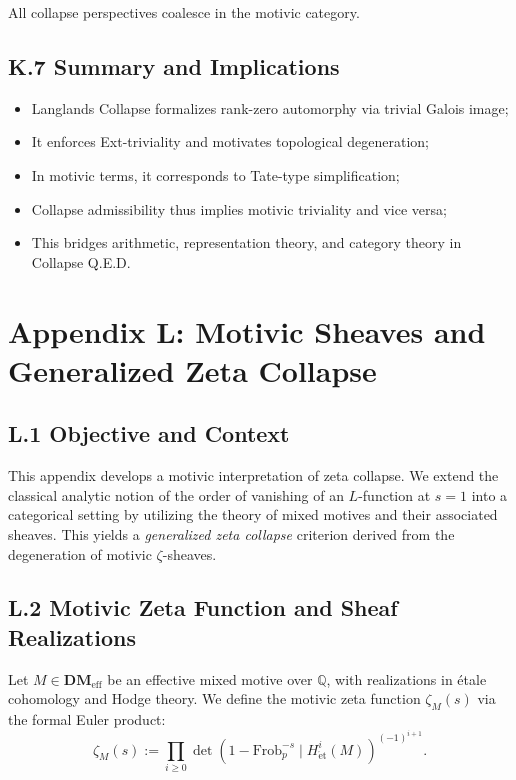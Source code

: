 \documentclass[11pt]{article}
\begin{document}
All collapse perspectives coalesce in the motivic category.

\subsection*{K.7 Summary and Implications}

\begin{itemize}
  \item Langlands Collapse formalizes rank-zero automorphy via trivial Galois image;
  \item It enforces Ext-triviality and motivates topological degeneration;
  \item In motivic terms, it corresponds to Tate-type simplification;
  \item Collapse admissibility thus implies motivic triviality and vice versa;
  \item This bridges arithmetic, representation theory, and category theory in Collapse Q.E.D.
\end{itemize}



\appendix
\section*{Appendix L: Motivic Sheaves and Generalized Zeta Collapse}

\subsection*{L.1 Objective and Context}

This appendix develops a motivic interpretation of zeta collapse. We extend the classical analytic notion of the order of vanishing of an \( L \)-function at \( s=1 \) into a categorical setting by utilizing the theory of mixed motives and their associated sheaves. This yields a \emph{generalized zeta collapse} criterion derived from the degeneration of motivic \( \zeta \)-sheaves.

\subsection*{L.2 Motivic Zeta Function and Sheaf Realizations}

Let \( M \in \mathbf{DM}_{\mathrm{eff}} \) be an effective mixed motive over \( \mathbb{Q} \), with realizations in étale cohomology and Hodge theory. We define the motivic zeta function \( \zeta_M(s) \) via the formal Euler product:
\[
\zeta_M(s) := \prod_{i \geq 0} \det(1 - \mathrm{Frob}_p^{-s} \mid H^i_{\mathrm{\acute{e}t}}(M))^{(-1)^{i+1}}.
\]
\end{document}
